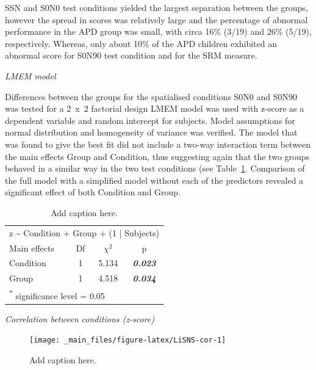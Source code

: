 \documentclass[a4paper, twoside]{templates/ociamthesis}
\begin{document}
SSN and S0N0 test conditions yielded the largest separation between the groups, however the spread in scores was relatively large and the percentage of abnormal performance in the APD group was small, with circa 16\% (3/19) and 26\% (5/19), respectively. Whereas, only about 10\% of the APD children exhibited an abnormal score for S0N90 test condition and for the SRM measure.

\colorbox[HTML]{CCCCFF}{\emph{LMEM model}}

Differences between the groups for the spatialised conditions S0N0 and S0N90 was tested for a 2~x~2 factorial design LMEM model was used with z-score as a dependent variable and random intercept for subjects. Model assumptions for normal distribution and homogeneity of variance was verified. The model that was found to give the best fit did not include a two-way interaction term between the main effects Group and Condition, thus suggesting again that the two groups behaved in a similar way in the two test conditions (see Table~\ref{tab:LiSNS-zLMEM}. Comparison of the full model with a simplified model without each of the predictors revealed a significant effect of both Condition and Group.

\begin{table}

\caption{\label{tab:LiSNS-zLMEM}Add caption here.}
\centering
\begin{tabular}[t]{lcc>{}c}
\toprule
\multicolumn{4}{c}{z \textasciitilde{} Condition + Group + (1 | Subjects)} \\
\cmidrule(l{3pt}r{3pt}){1-4}
Main effects & Df & $\chi^{2}$ & p\\
\midrule
Condition & 1 & 5.134 & \em{\textbf{0.023}}\\
Group & 1 & 4.518 & \em{\textbf{0.034}}\\
\bottomrule
\multicolumn{4}{l}{\textsuperscript{*} significance level = 0.05}\\
\end{tabular}
\end{table}

\colorbox[HTML]{CCCCFF}{\emph{Correlation between conditions (z-score)}}

\begin{figure}

{\centering \texttt{[image: \_main\_files/figure-latex/LiSNS-cor-1]} 

}

\caption{Add caption here.}\label{fig:LiSNS-cor}
\end{figure}
\end{document}
